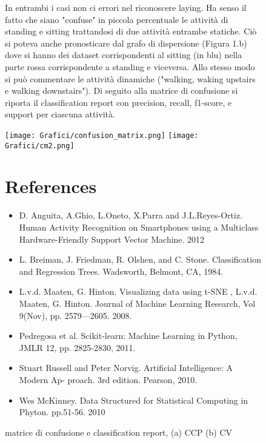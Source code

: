 \documentclass[]{article}
\begin{document}
\begin{figure}
In entrambi i casi non ci  errori nel riconoscere laying. Ha senso il fatto che siano "confuse" in piccola percentuale le attività di standing e sitting trattandosi di due attività entrambe statiche. Ciò si poteva anche pronosticare dal grafo di dispersione (Figura 1.b) dove si hanno dei dataset corrispondenti al sitting (in blu) nella parte rossa corrispondente a standing e viceversa. Allo stesso modo si può commentare le attività dinamiche ("walking, waking upstairs e walking downstairs"). Di seguito alla matrice di confusione si riporta il classification report con precision, recall, f1-score, e support per ciascuna attività. 
\begin{center}

\texttt{[image: Grafici/confusion\_matrix.png]}
\hspace*{\fill}
\texttt{[image: Grafici/cm2.png]}

\hspace*{\fill}
\caption{matrice di confusione e classification report, (a) CCP (b) CV}
\end{center}


\section{References}
\begin{itemize}
\item []D. Anguita, A.Ghio, L.Oneto, X.Parra and J.L.Reyes-Ortiz. Human Activity Recognition on Smartphones
using a Multiclass Hardware-Friendly Support
Vector Machine. 2012
\item []L. Breiman, J. Friedman, R. Olshen, and C. Stone. Classification and Regression Trees. Wadsworth, Belmont, CA, 1984.
\item []L.v.d. Maaten, G. Hinton. Visualizing data using t-SNE , L.v.d. Maaten, G. Hinton. Journal of Machine Learning Research, Vol 9(Nov), pp. 2579—2605. 2008.
\item []Pedregosa et al. Scikit-learn: Machine Learning in Python, JMLR 12, pp. 2825-2830, 2011.
\item []Stuart Russell and Peter Norvig. Artificial Intelligence: A Modern Ap-
proach. 3rd edition. Pearson, 2010.
\item []Wes McKinney. Data Structured for Statistical Computing in Phyton. pp.51-56. 2010
\end{itemize}
\end{figure}
\end{document}
